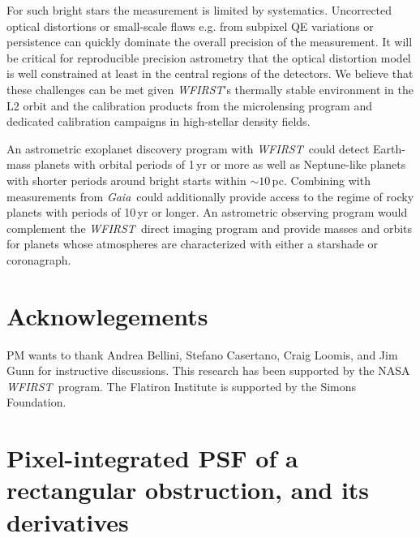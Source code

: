 \documentclass[modern, times]{aastex61}
\newcommand\wfirst{\textit{WFIRST}}
\newcommand\gaia{\textit{Gaia}}
\begin{document}
For such bright stars the measurement is limited by systematics. 
Uncorrected optical distortions or small-scale flaws e.g. from subpixel QE variations or persistence can quickly dominate the overall precision of the measurement.
It will be critical for reproducible precision astrometry that the optical distortion model is well constrained at least in the central regions of the detectors.
We believe that these challenges can be met given \wfirst's thermally stable environment in the L2 orbit and the calibration products from the microlensing program and dedicated calibration campaigns in high-stellar density fields.

An astrometric exoplanet discovery program with \wfirst\ could detect Earth-mass planets with orbital periods of 1\,yr or more as well as Neptune-like planets with shorter periods around bright starts within $\sim10\,$pc.
Combining with measurements from \gaia\ could additionally provide access to the regime of rocky planets with periods of 10\,yr or longer.
An astrometric observing program would complement the \wfirst\ direct imaging program and provide masses and orbits for planets  whose atmospheres are characterized with either a starshade or coronagraph.


\section*{Acknowlegements}
PM wants to thank Andrea Bellini, Stefano Casertano, Craig Loomis, and Jim Gunn for instructive discussions.  This research has been supported by the NASA \wfirst\ program.
The Flatiron Institute is supported by the Simons Foundation.




\appendix

\section{Pixel-integrated PSF of a rectangular obstruction, and its derivatives}
\label{sec:derivation}
\end{document}
